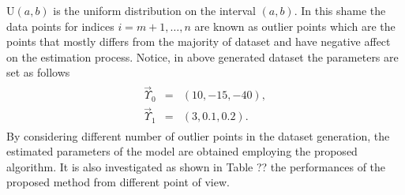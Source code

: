 \documentclass{IJFS}
\begin{document}
$\textrm{U}(a,b)$ is the uniform distribution on the interval $(a,b)$.
In this shame the data points  for indices $i=m+1,\ldots,n$ are known as outlier points which are the points that mostly differs from the majority of dataset and have negative affect on the estimation process.
Notice, in above generated dataset the parameters are set as follows
\begin{eqnarray*}
\begin{array}{cclcccl}
\vec{\Upsilon}_0 & = & (10,   -15,   -40), \\
\vec{\Upsilon}_1 & = & (3,    0.1,   0.2).
\end{array}
\end{eqnarray*}
By considering different number of outlier points in the dataset generation, the estimated parameters of the model are obtained employing the proposed algorithm.
It is also investigated  as  shown in Table ?? the performances of the proposed method from different point of view.
\end{document}
